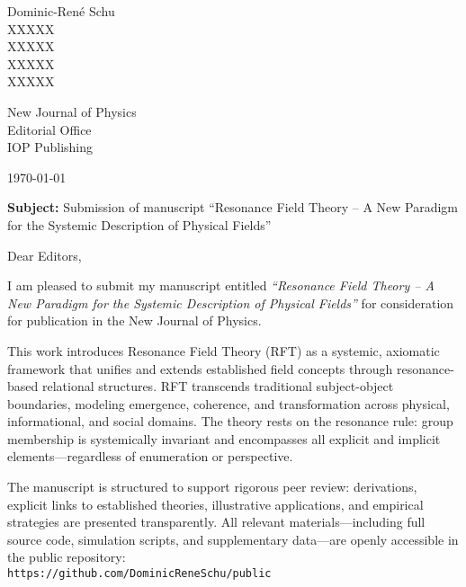 \documentclass[a4paper,12pt]{article}
\begin{document}
	
	\vspace*{-2cm}
	
	Dominic-René Schu\\
	XXXXX\\
	XXXXX\\
	XXXXX\\
	XXXXX\\
	
	\vspace{1cm}
	
	New Journal of Physics\\
	Editorial Office\\
	IOP Publishing
	
	\vspace{1cm}
	
	\today
	
	\vspace{1cm}
	
	\textbf{Subject:} Submission of manuscript ``Resonance Field Theory – A New Paradigm for the Systemic Description of Physical Fields''
	
	\vspace{1cm}
	
	Dear Editors,
	
	\vspace{0.5cm}
	
	I am pleased to submit my manuscript entitled \textit{``Resonance Field Theory – A New Paradigm for the Systemic Description of Physical Fields''} for consideration for publication in the New Journal of Physics.
	
	This work introduces Resonance Field Theory (RFT) as a systemic, axiomatic framework that unifies and extends established field concepts through resonance-based relational structures. RFT transcends traditional subject-object boundaries, modeling emergence, coherence, and transformation across physical, informational, and social domains. The theory rests on the resonance rule: group membership is systemically invariant and encompasses all explicit and implicit elements—regardless of enumeration or perspective.
	
	The manuscript is structured to support rigorous peer review: derivations, explicit links to established theories, illustrative applications, and empirical strategies are presented transparently. All relevant materials—including full source code, simulation scripts, and supplementary data—are openly accessible in the public repository:\\
	\texttt{https://github.com/DominicReneSchu/public}
	
\end{document}
